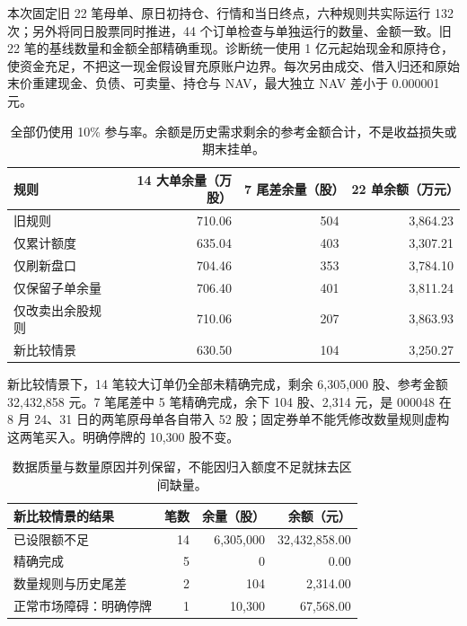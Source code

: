 \clearpage


本次固定旧 22 笔母单、原日初持仓、行情和当日终点，六种规则共实际运行 132 次；另外将同日股票同时推进，44 个订单检查与单独运行的数量、金额一致。旧 22 笔的基线数量和金额全部精确重现。诊断统一使用 1 亿元起始现金和原持仓，使资金充足，不把这一现金假设冒充原账户边界。每次另由成交、借入归还和原始末价重建现金、负债、可卖量、持仓与 NAV，最大独立 NAV 差小于 0.000001 元。

\begin{table}[H]\centering\small

\begin{tabular}{lrrr}

\toprule 规则 &14 大单余量（万股）&7 尾差余量（股）&22 单余额（万元）\\\midrule

旧规则 &710.06&504&3,864.23\\

仅累计额度 &635.04&403&3,307.21\\

仅刷新盘口 &704.46&353&3,784.10\\

仅保留子单余量 &706.40&401&3,811.24\\

仅改卖出余股规则 &710.06&207&3,863.93\\

新比较情景 &630.50&104&3,250.27\\

\bottomrule\end{tabular}

\caption{全部仍使用 10\% 参与率。余额是历史需求剩余的参考金额合计，不是收益损失或期末挂单。}\end{table}

新比较情景下，14 笔较大订单仍全部未精确完成，剩余 6,305,000 股、参考金额 32,432,858 元。7 笔尾差中 5 笔精确完成，余下 104 股、2,314 元，是 000048 在 8 月 24、31 日的两笔原母单各自带入 52 股；固定券单不能凭修改数量规则虚构这两笔买入。明确停牌的 10,300 股不变。

\begin{table}[H]\centering\small\begin{tabular}{lrrr}

\toprule 新比较情景的结果 &笔数&余量（股）&余额（元）\\\midrule

已设限额不足 &14&6,305,000&32,432,858.00\\

精确完成 &5&0&0.00\\

数量规则与历史尾差 &2&104&2,314.00\\

正常市场障碍：明确停牌 &1&10,300&67,568.00\\

\bottomrule\end{tabular}

\caption{数据质量与数量原因并列保留，不能因归入额度不足就抹去区间缺量。}\end{table}


